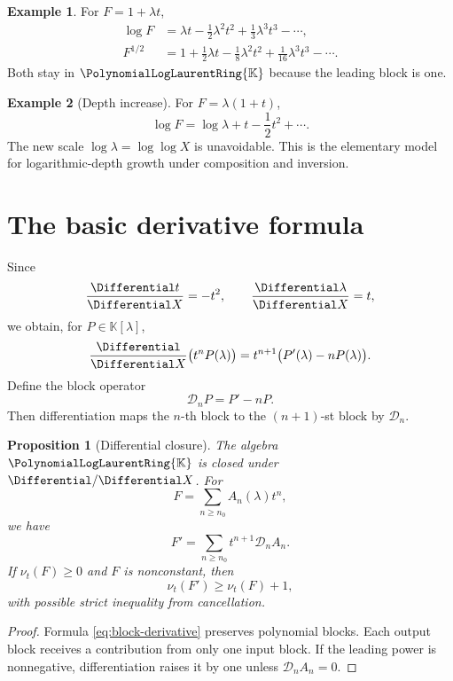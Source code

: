 \documentclass[11pt,openany]{book}
\theoremstyle{definition}
\newtheorem{example}{Example}[chapter]
\theoremstyle{plain}
\newtheorem{proposition}{Proposition}[chapter]
\theoremstyle{remark}
\newcommand{\K}{\mathbb{K}}
\newcommand{\Plog}{\PolynomialLogLaurentRing{\K}}
\newcommand{\val}{\nu}
\begin{document}
\begin{example}
For \(F=1+\lambda t\),
\begin{align*}
 \log F&=\lambda t-\frac12\lambda^2t^2
 +\frac13\lambda^3t^3-\cdots,\\
 F^{1/2}&=1+\frac12\lambda t-\frac18\lambda^2t^2
 +\frac1{16}\lambda^3t^3-\cdots.
\end{align*}
Both stay in \(\Plog\) because the leading block is one.
\end{example}

\begin{example}[Depth increase]
For \(F=\lambda(1+t)\),
\[
 \log F=\log\lambda+t-\frac12t^2+\cdots.
\]
The new scale \(\log\lambda=\log\log X\) is unavoidable. This is the elementary model for logarithmic-depth growth under composition and inversion.
\end{example}

\section{The basic derivative formula}
Since
\[
 \frac{\Differential t}{\Differential X}=-t^2,
 \qquad
 \frac{\Differential\lambda}{\Differential X}=t,
\]
we obtain, for \(P\in\K[\lambda]\),
\begin{equation}\label{eq:block-derivative}
 \frac{\Differential}{\Differential X}\bigl(t^nP(\lambda)\bigr)
 =t^{n+1}\bigl(P'(\lambda)-nP(\lambda)\bigr).
\end{equation}
Define the block operator
\begin{equation}\label{eq:Dn}
 \mathcal D_nP=P'-nP.
\end{equation}
Then differentiation maps the \(n\)-th block to the \((n+1)\)-st block by \(\mathcal D_n\).

\begin{proposition}[Differential closure]\label{prop:differential-closure}
The algebra \(\Plog\) is closed under \(\Differential/\Differential X\). For
\[
 F=\sum_{n\ge n_0}A_n(\lambda)t^n,
\]
we have
\begin{equation}\label{eq:series-derivative}
 F'=\sum_{n\ge n_0}t^{n+1}\mathcal D_nA_n.
\end{equation}
If \(\val_t(F)\ge0\) and \(F\) is nonconstant, then
\[
 \val_t(F')\ge\val_t(F)+1,
\]
with possible strict inequality from cancellation.
\end{proposition}

\begin{proof}
Formula \cref{eq:block-derivative} preserves polynomial blocks. Each output block receives a contribution from only one input block. If the leading power is nonnegative, differentiation raises it by one unless \(\mathcal D_nA_n=0\).
\end{proof}
\end{document}
